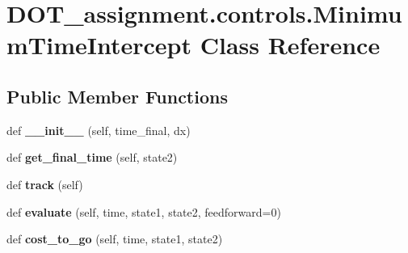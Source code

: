 \hypertarget{class_d_o_t__assignment_1_1controls_1_1_minimum_time_intercept}{}\section{D\+O\+T\+\_\+assignment.\+controls.\+Minimum\+Time\+Intercept Class Reference}
\label{class_d_o_t__assignment_1_1controls_1_1_minimum_time_intercept}
\subsection*{Public Member Functions}
\begin{DoxyCompactItemize}
\item 
\mbox{\label{class_d_o_t__assignment_1_1controls_1_1_minimum_time_intercept_af00b3e740c6f2b676756ee5a4b889d20}} 
def {\bfseries \+\_\+\+\_\+init\+\_\+\+\_\+} (self, time\+\_\+final, dx)
\item 
\mbox{\label{class_d_o_t__assignment_1_1controls_1_1_minimum_time_intercept_af5d935e276d076a088c0b84a008c81cf}} 
def {\bfseries get\+\_\+final\+\_\+time} (self, state2)
\item 
\mbox{\label{class_d_o_t__assignment_1_1controls_1_1_minimum_time_intercept_a19f6812a51d2a44c6ca41e9161b5f322}} 
def {\bfseries track} (self)
\item 
\mbox{\label{class_d_o_t__assignment_1_1controls_1_1_minimum_time_intercept_a2886cc92e34c54f7eb8f46d092203c03}} 
def {\bfseries evaluate} (self, time, state1, state2, feedforward=0)
\item 
\mbox{\label{class_d_o_t__assignment_1_1controls_1_1_minimum_time_intercept_afaa102148520531cdaf4b087a2c82d9d}} 
def {\bfseries cost\+\_\+to\+\_\+go} (self, time, state1, state2)
\end{DoxyCompactItemize}
